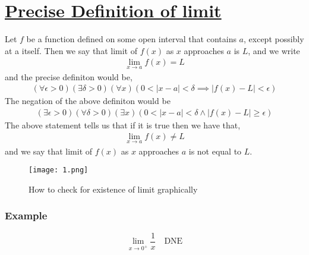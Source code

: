 \documentclass[12pt,a4paper,fleqn]{article}
\begin{document}
\section*{ \underline{Precise Definition of limit} } 
   Let \(f\) be a function defined on some open interval that contains \(a\), except possibly at a itself. Then we say that limit of \(f(x)\) as \(x\) approaches \(a \)  is \(L\), and we write 
    \begin{align*}
        \lim_{x \to a} f(x) = L 
   \end{align*}    
and the precise definiton would be, 
 \begin{align*}
    \left( \forall \epsilon > 0 \right) \left( \exists \delta > 0 \right)\left( \forall x \right) \left( 0 < |x-a|< \delta \implies |f(x)-L|< \epsilon \right)   
\end{align*}
The negation of the above definiton would be 
 \begin{align*}
    \left( \exists \epsilon > 0 \right) \left( \forall \delta > 0 \right)\left( \exists x \right) \left( 0< |x-a| < \delta \wedge |f(x)-L| \geq \epsilon \right)  
\end{align*}
The above statement tells us that if it is true then we have that,
 \begin{align*}
    \lim_{x \to a} f(x) \neq L
\end{align*}
and we say that limit of \(f(x)\) as \(x\) approaches \(a \)  is  not equal to \(L\).

\begin{figure}[ht]
    \centering
    \texttt{[image: 1.png]}
    \caption{How to check for existence of limit graphically}
\end{figure}
 \subsubsection*{Example} 
 \begin{equation*}
     \lim_{x \to 0^+} \frac{1}{x} \quad \text{DNE}
 \end{equation*}    
\end{document}
